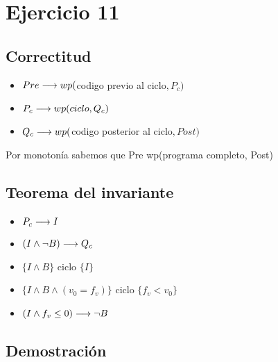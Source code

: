 \documentclass{article}
\begin{document}
\section*{Ejercicio 11}

\subsection*{Correctitud}
\begin{itemize}
    \item $Pre \longrightarrow wp($codigo previo al ciclo$, P_{c})$
    \item $P_{c} \longrightarrow wp(ciclo, Q_{c})$
    \item $Q_{c} \longrightarrow wp($codigo posterior al ciclo$, Post)$
\end{itemize}

Por monotonía sabemos que Pre \implica wp(programa completo, Post)

\subsection*{Teorema del invariante}
\begin{itemize}
    \item $P_{c} \longrightarrow I$
    \item $(I \wedge \neg B) \longrightarrow Q_{c}$
    \item $\{I \wedge B\}$ ciclo $\{ I \}$
    \item $\{I \wedge B \wedge (v_{0} = f_{v})\}$ ciclo $\{f_{v} < v_{0}\}$
    \item $(I \wedge f_{v} \leq 0) \longrightarrow \neg B$
\end{itemize}

\subsection*{Demostración}
\end{document}
